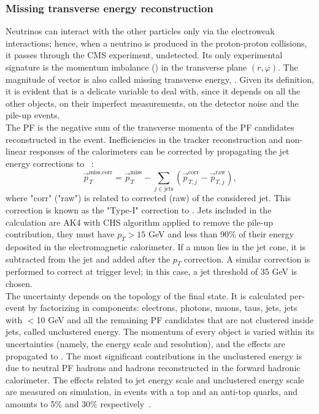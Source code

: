 \subsubsection{Missing transverse energy reconstruction}
\label{ssec:met_description}
Neutrinos can interact with the other particles only via the electroweak interactions; hence, when a neutrino is produced in the proton-proton collisions, it passes through the CMS experiment, undetected. Its only experimental signature is the momentum imbalance (\met) in the transverse plane $(r, \varphi)$. The magnitude of \met vector is also called missing transverse energy, \MET. Given its definition, it is evident that \MET is a delicate variable to deal with, since it depends on all the other objects, on their imperfect measurements, on the detector noise and the pile-up events.\\
The PF \MET is the negative sum of the transverse momenta of the PF candidates reconstructed in the event. Inefficiencies in the tracker reconstruction and non-linear responses of the calorimeters can be corrected by propagating the jet energy corrections to \met~\cite{CMS:2016ljj}:
\begin{equation}
\vec{p}_T^{\text{miss,corr}} = \vec{p}_T^{\text{miss}} - \sum_{j \in \text{jets}} \left( \vec{p}_{T,j}^{\text{corr}} - \vec{p}_{T,j}^{\text{raw}}\right),
\label{eq:met_typeI}
\end{equation}
where "corr" ("raw") is related to corrected (raw) \pt of the considered jet. This correction is known as the "Type-I" correction to \MET. Jets included in the calculation are AK4 with CHS algorithm applied to remove the pile-up contribution, they must have $p_T>15$ GeV and less than 90\% of their energy deposited in the electromagnetic calorimeter. If a muon lies in the jet cone, it is subtracted from the jet and added after the $p_T$ correction. A similar correction is performed to correct \met at trigger level; in this case, a jet \pt threshold of 35 GeV is chosen.\\
The \MET uncertainty depends on the topology of the final state. It is calculated per-event by factorizing \met in components: electrons, photons, muons, taus, jets, jets with \pt$<$10 GeV and all the remaining PF candidates that are not clustered inside jets, called unclustered energy. The momentum of every object is varied within its uncertainties (namely, the energy scale and resolution), and the effects are propagated to \met. The most significant contributions in the unclustered energy is due to neutral PF hadrons and hadrons reconstructed in the forward hadronic calorimeter. The effects related to jet energy scale and unclustered energy scale are measured on simulation, in events with a top and an anti-top quarks, and amounts to 5\% and 30\% respectively~\cite{CMS:2016ljj}.\\

